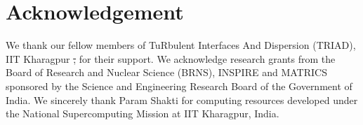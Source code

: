 \documentclass[%
aip,
amsmath,amssymb,
reprint,
]{revtex4-1}
\providecommand{\DIFdel}[1]{{\protect\color{red}\sout{#1}}}                      %
\providecommand{\DIFdelbegin}{} %
\providecommand{\DIFdelend}{} %
\newcommand{\DIFscaledelfig}{0.5}
\newlength{\DIFdelgraphicswidth} %
\newlength{\DIFdelgraphicsheight} %
\newcommand{\DIFdelincludegraphics}[2][]{%
\sbox{\DIFdelgraphicsbox}{\DIFOincludegraphics[#1]{#2}}%
\settoboxwidth{\DIFdelgraphicswidth}{\DIFdelgraphicsbox} %
\settoboxtotalheight{\DIFdelgraphicsheight}{\DIFdelgraphicsbox} %
\scalebox{\DIFscaledelfig}{%
\parbox[b]{\DIFdelgraphicswidth}{\usebox{\DIFdelgraphicsbox}\\[-\baselineskip] \rule{\DIFdelgraphicswidth}{0em}}\llap{\resizebox{\DIFdelgraphicswidth}{\DIFdelgraphicsheight}{%
\setlength{\unitlength}{\DIFdelgraphicswidth}%
\begin{picture}(1,1)%
\thicklines\linethickness{2pt} %
{\color[rgb]{1,0,0}\put(0,0){\framebox(1,1){}}}%
{\color[rgb]{1,0,0}\put(0,0){\line( 1,1){1}}}%
{\color[rgb]{1,0,0}\put(0,1){\line(1,-1){1}}}%
\end{picture}%
}\hspace*{3pt}}} %
} %
\DeclareRobustCommand{\DIFdelbegin}{\DIFOdelbegin \let\includegraphics\DIFdelincludegraphics} %
\DeclareRobustCommand{\DIFdelend}{\DIFOaddend \let\includegraphics\DIFOincludegraphics} %
\begin{document}
			\section{Acknowledgement}
			We thank our fellow members of TuRbulent Interfaces And Dispersion (TRIAD), IIT Kharagpur \DIFdelbegin \DIFdel{, }\DIFdelend for their support. We acknowledge research grants from the Board of Research and Nuclear Science (BRNS), INSPIRE and MATRICS sponsored by the Science and Engineering Research Board of the Government of India. We sincerely thank Param Shakti for computing resources developed under the National Supercomputing Mission at IIT Kharagpur, India.

			
			
\end{document}
